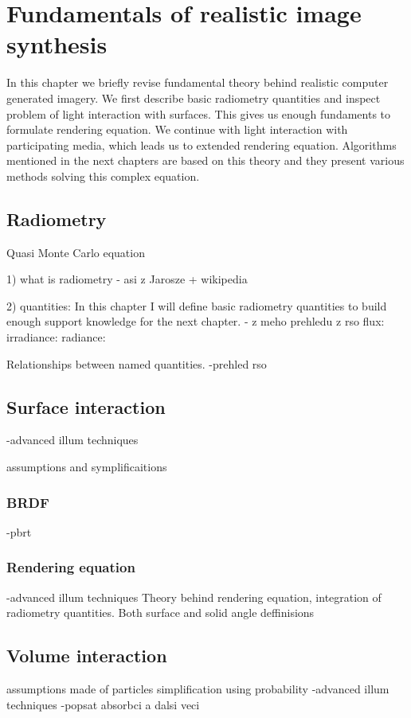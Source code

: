 \chapter{Fundamentals of realistic image synthesis}

In this chapter we briefly revise fundamental theory behind realistic computer generated imagery. We first describe basic radiometry quantities and inspect problem of light interaction with surfaces. This gives us enough fundaments to formulate rendering equation. We continue with light interaction with participating media, which leads us to extended rendering equation. Algorithms mentioned in the next chapters are based on this theory and they present various methods solving this complex equation.

\section{Radiometry}

Quasi Monte Carlo equation

\cite{Dutre01globalillumination} %
1) what is radiometry
- asi z Jarosze + wikipedia

2) quantities:
In this chapter I will define basic radiometry quantities to build enough support knowledge for the next chapter. 
- z meho prehledu z rso
flux: 
irradiance:
radiance:

Relationships between named quantities.
-prehled rso

\section{Surface interaction}
-advanced illum techniques

assumptions and symplificaitions 
\subsection{BRDF}
-pbrt
\subsection{Rendering equation}
-advanced illum techniques
Theory behind rendering equation, integration of radiometry quantities. Both surface and solid angle deffinisions

\section{Volume interaction}
assumptions made of particles simplification using probability
-advanced illum techniques
-popsat absorbci a dalsi veci
